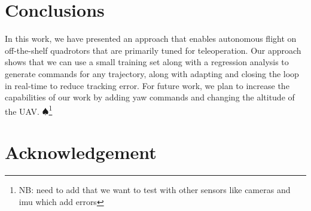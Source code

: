 \documentclass[letterpaper, 10 pt, conference]{ieeeconf}  %
\newcommand\NB[1]{$\spadesuit$\footnote{NB: #1}}
\begin{document}
\section{Conclusions} \label{sec:conc}
In this work, we have presented an approach that enables autonomous flight on off-the-shelf quadrotors that are primarily tuned for teleoperation. Our approach shows that we can use a small training set along with a regression analysis to generate commands for any trajectory, along with adapting and closing the loop in real-time to reduce tracking error. For future work, we plan to increase the capabilities of our work by adding yaw commands and changing the altitude of the UAV.
\NB{need to add that we want to test with other sensors like cameras and imu which add errors}


\section{Acknowledgement}


\addtolength{\textheight}{-12cm}   %








\end{document}
